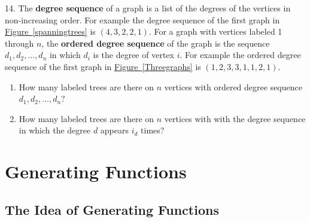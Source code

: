 \documentclass[10pt,]{book}
\newcommand{\terminology}[1]{\textbf{#1}}
\theoremstyle{plain}
\theoremstyle{definition}
\theoremstyle{definition}
\numberwithin{equation}{chapter}
\newcommand{\importantarrow}{\Rightarrow}
\begin{document}
\begin{exerciselist}
\item[14.]\marginsymbol[-1em]{\pdftooltip{$\importantarrow$}{especially interesting}} \hypertarget{exercise-36}{}The \terminology{degree sequence} of a graph is a list of the degrees of the vertices in non-increasing order. For example the degree sequence of the first graph in \hyperref[spanningtrees]{Figure~\ref{spanningtrees}} is \((4, 3, 2, 2, 1)\). For a graph with vertices labeled 1 through \(n\), the \terminology{ordered degree sequence} of the graph is the sequence \(d_1, d_2,\dots, d_n\) in which \(d_i\) is the degree of vertex \(i\). For example the ordered degree sequence of the first graph in \hyperref[Threegraphs]{Figure~\ref{Threegraphs}} is \((1,2,3,3,1,1,2,1)\).%
\par
\leavevmode%
\begin{enumerate}[label=(\alph*)]
\item\hypertarget{li-66}{}How many labeled trees are there on \(n\) vertices with ordered degree sequence \(d_1, d_2, \dots, d_n\)?%
\item\hypertarget{li-67}{}How many labeled trees are there on \(n\) vertices with with the degree sequence in which the degree \(d\) appears \(i_d\) times?%
\end{enumerate}
%
\par\smallskip
\end{exerciselist}
\typeout{************************************************}
\typeout{************************************************}
\chapter[{Generating Functions}]{Generating Functions}\label{ch_genfns}
\typeout{************************************************}
\typeout{************************************************}
\section[{The Idea of Generating Functions}]{The Idea of Generating Functions}\label{sec_genfns-idea}
\typeout{************************************************}
\typeout{************************************************}
\end{document}
